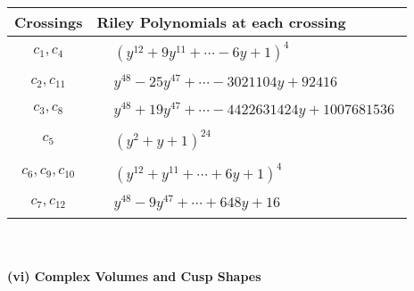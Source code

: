 \documentclass[1p]{elsarticle_modified}
\theoremstyle{definition}
\begin{document}
\begin{tabular}{m{50pt}|m{274pt}}
Crossings & \hspace{64pt}Riley Polynomials at each crossing \\
\hline $$\begin{aligned}c_{1},c_{4}\end{aligned}$$&$\begin{aligned}
&(y^{12}+9 y^{11}+\cdots-6 y+1)^{4}
\end{aligned}$\\
\hline $$\begin{aligned}c_{2},c_{11}\end{aligned}$$&$\begin{aligned}
&y^{48}-25 y^{47}+\cdots-3021104 y+92416
\end{aligned}$\\
\hline $$\begin{aligned}c_{3},c_{8}\end{aligned}$$&$\begin{aligned}
&y^{48}+19 y^{47}+\cdots-4422631424 y+1007681536
\end{aligned}$\\
\hline $$\begin{aligned}c_{5}\end{aligned}$$&$\begin{aligned}
&(y^2+y+1)^{24}
\end{aligned}$\\
\hline $$\begin{aligned}c_{6},c_{9},c_{10}\end{aligned}$$&$\begin{aligned}
&(y^{12}+y^{11}+\cdots+6 y+1)^{4}
\end{aligned}$\\
\hline $$\begin{aligned}c_{7},c_{12}\end{aligned}$$&$\begin{aligned}
&y^{48}-9 y^{47}+\cdots+648 y+16
\end{aligned}$\\
\hline
\end{tabular}\\~\\
\newpage\flushleft \textbf{(vi) Complex Volumes and Cusp Shapes}
\end{document}
